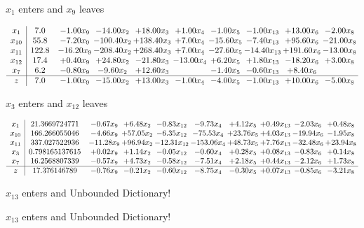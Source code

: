 \documentclass[9pt]{article}
\begin{document}
 $ x_{1} $ enters and $ x_{9} $ leaves 

 \[\begin{array}{c| c c@{\hskip 2pt} c@{\hskip 2pt} c@{\hskip 2pt} c@{\hskip 2pt} c@{\hskip 2pt} c@{\hskip 2pt} c@{\hskip 2pt} c@{\hskip 2pt} }
 x_{1}   &  7.0 & -1.00 x_{9} & -14.00 x_{2} & + 18.00 x_{3} & +  1.00 x_{4} & -1.00 x_{5} & -1.00 x_{13} & + 13.00 x_{6} & -2.00 x_{8}\\
 x_{10}   &  55.8 & -7.20 x_{9} & -100.40 x_{2} & + 138.40 x_{3} & +  7.00 x_{4} & -15.60 x_{5} & -7.40 x_{13} & + 95.60 x_{6} & -21.00 x_{8}\\
 x_{11}   &  122.8 & -16.20 x_{9} & -208.40 x_{2} & + 268.40 x_{3} & +  7.00 x_{4} & -27.60 x_{5} & -14.40 x_{13} & + 191.60 x_{6} & -13.00 x_{8}\\
 x_{12}   &  17.4 & +  0.40 x_{9} & + 24.80 x_{2} & -21.80 x_{3} & -13.00 x_{4} & +  6.20 x_{5} & +  1.80 x_{13} & -18.20 x_{6} & +  3.00 x_{8}\\
 x_{7}   &  6.2 & -0.80 x_{9} & -9.60 x_{2} & + 12.60 x_{3} &   & -1.40 x_{5} & -0.60 x_{13} & +  8.40 x_{6} &   \\
\hline
z    &  7.0 & -1.00 x_{9} & -15.00 x_{2} & + 13.00 x_{3} & -1.00 x_{4} & -4.00 x_{5} & -1.00 x_{13} & + 10.00 x_{6} & -5.00 x_{8}\\
\end{array}\]


 $ x_{3} $ enters and $ x_{12} $ leaves 

 \[\begin{array}{c| c c@{\hskip 2pt} c@{\hskip 2pt} c@{\hskip 2pt} c@{\hskip 2pt} c@{\hskip 2pt} c@{\hskip 2pt} c@{\hskip 2pt} c@{\hskip 2pt} }
 x_{1}   &  21.3669724771 & -0.67 x_{9} & +  6.48 x_{2} & -0.83 x_{12} & -9.73 x_{4} & +  4.12 x_{5} & +  0.49 x_{13} & -2.03 x_{6} & +  0.48 x_{8}\\
 x_{10}   &  166.266055046 & -4.66 x_{9} & + 57.05 x_{2} & -6.35 x_{12} & -75.53 x_{4} & + 23.76 x_{5} & +  4.03 x_{13} & -19.94 x_{6} & -1.95 x_{8}\\
 x_{11}   &  337.027522936 & -11.28 x_{9} & + 96.94 x_{2} & -12.31 x_{12} & -153.06 x_{4} & + 48.73 x_{5} & +  7.76 x_{13} & -32.48 x_{6} & + 23.94 x_{8}\\
 x_{3}   &  0.798165137615 & +  0.02 x_{9} & +  1.14 x_{2} & -0.05 x_{12} & -0.60 x_{4} & +  0.28 x_{5} & +  0.08 x_{13} & -0.83 x_{6} & +  0.14 x_{8}\\
 x_{7}   &  16.2568807339 & -0.57 x_{9} & +  4.73 x_{2} & -0.58 x_{12} & -7.51 x_{4} & +  2.18 x_{5} & +  0.44 x_{13} & -2.12 x_{6} & +  1.73 x_{8}\\
\hline
z    &  17.376146789 & -0.76 x_{9} & -0.21 x_{2} & -0.60 x_{12} & -8.75 x_{4} & -0.30 x_{5} & +  0.07 x_{13} & -0.85 x_{6} & -3.21 x_{8}\\
\end{array}\]


 $ x_{13} $ enters and Unbounded Dictionary!


 $ x_{13} $ enters and Unbounded Dictionary!
\end{document}
